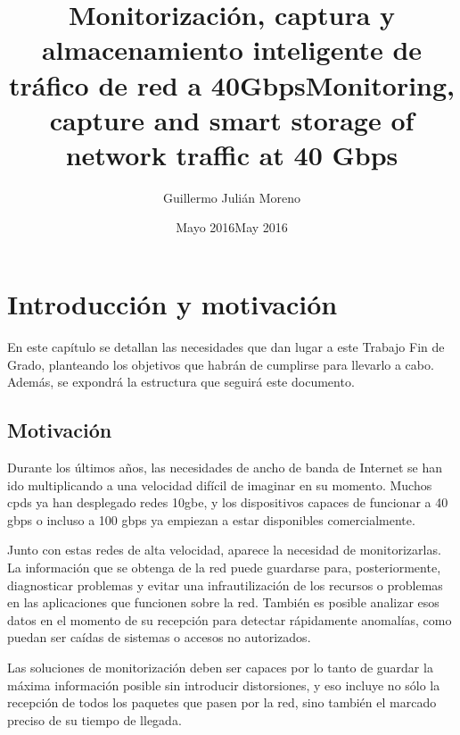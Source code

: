 \documentclass[twoside, 12pt]{epstfg}
\title[spa]{Monitorización, captura y almacenamiento inteligente de tráfico de red a 40Gbps}
\title[eng]{Monitoring, capture and smart storage of network traffic at 40 Gbps}
\author{Guillermo Julián Moreno}
\date[spa]{Mayo 2016}
\date[eng]{May 2016}
\begin{document}

\frontmatter

\maketitle[spa]

\makeinnertitle[spa]

\makeabstract[spa]
\makeabstract[eng]

\tableofcontents
\clearsidepage
\listoftables
\clearsidepage
\listoffigures
\clearsidepage

\mainmatter

\chapter{Introducción y motivación}

En este capítulo se detallan las necesidades que dan lugar a este Trabajo Fin de Grado, planteando los objetivos que habrán de cumplirse para llevarlo a cabo. Además, se expondrá la estructura que seguirá este documento.

\section{Motivación}

Durante los últimos años, las necesidades de ancho de banda de Internet se han ido multiplicando a una velocidad difícil de imaginar en su momento. Muchos \glspl{cpd} ya han desplegado redes \gls{10gbe}, y los dispositivos capaces de funcionar a 40 \gls{gbps} o incluso a 100 \gls{gbps} ya empiezan a estar disponibles comercialmente.

Junto con estas redes de alta velocidad, aparece la necesidad de monitorizarlas. La información que se obtenga de la red puede guardarse para, posteriormente, diagnosticar problemas y evitar una infrautilización de los recursos o problemas en las aplicaciones que funcionen sobre la red. También es posible analizar esos datos en el momento de su recepción para detectar rápidamente anomalías, como puedan ser caídas de sistemas o accesos no autorizados.

Las soluciones de monitorización deben ser capaces por lo tanto de guardar la máxima información posible sin introducir distorsiones, y eso incluye no sólo la recepción de todos los paquetes que pasen por la red, sino también el marcado preciso de su tiempo de llegada.
\end{document}
